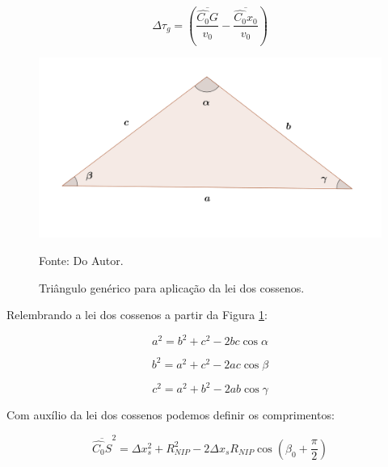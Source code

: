 \documentclass[a4paper, 12pt]{article}
\begin{document}
\begin{equation}
\label{eq:1.6}
\Delta \tau_g = \left( \frac{\overline{\hat{C_0}G}}{v_0} - \frac{\overline{\hat{C_0}x_0}}{v_0} \right)
\end{equation}

\begin{figure}[H]
\caption{Triângulo genérico para aplicação da lei dos cossenos.}
\begin{center}
\includegraphics[scale=0.8]{images/leiCossenos.png}
\vspace{-0.3cm}
\end{center}
\begin{center}
 Fonte: Do Autor.
\end{center}
\label{fig:1.2}
\end{figure}

Relembrando a lei dos cossenos a partir da Figura \ref{fig:1.2}:

\begin{equation}
 \label{eq:1.7}
 a^2 = b^2 + c^2 - 2 b c \cos{\alpha}
\end{equation}

\begin{equation}
 \label{eq:1.8}
 b^2 = a^2 + c^2 - 2 a c \cos{\beta}
\end{equation}

\begin{equation}
 \label{eq:1.9}
 c^2 = a^2 + b^2 - 2 a b \cos{\gamma}
\end{equation}

Com auxílio da lei dos cossenos podemos definir os comprimentos:

\begin{equation}
 \label{eq:1.10}
 \overline{\hat{C_0}S}^2 = \Delta x_{s}^2 + R_{NIP}^2 - 2 \Delta x_s R_{NIP} 
 \cos{\left( \beta_0 + \frac{\pi}{2} \right)}
\end{equation}
\end{document}
